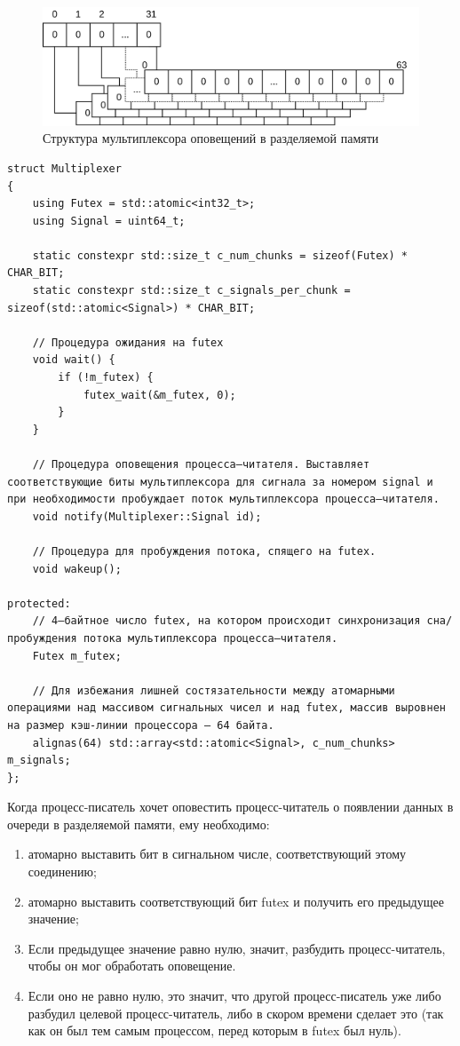 \begin{figure}[!h]
\caption{Структура мультиплексора оповещений в разделяемой памяти}
\label{chapter31:MuxZeroState}
\includegraphics[width=\textwidth]{../../graphics/schemes/futex}
\end{figure}

\begin{lstlisting}[float=!h,caption={Структура мультиплексора в памяти},label={chapter31:MultiplexerStruct},frame=tlrb]
struct Multiplexer
{
    using Futex = std::atomic<int32_t>;
    using Signal = uint64_t;

    static constexpr std::size_t c_num_chunks = sizeof(Futex) * CHAR_BIT;
    static constexpr std::size_t c_signals_per_chunk = sizeof(std::atomic<Signal>) * CHAR_BIT;
	
	// Процедура ожидания на futex
    void wait() {
    	if (!m_futex) {
   			futex_wait(&m_futex, 0);
   		}
    }
	
	// Процедура оповещения процесса—читателя. Выставляет соответствующие биты мультиплексора для сигнала за номером signal и при необходимости пробуждает поток мультиплексора процесса—читателя.
    void notify(Multiplexer::Signal id);
    
    // Процедура для пробуждения потока, спящего на futex.
    void wakeup();

protected:
	// 4—байтное число futex, на котором происходит синхронизация сна/пробуждения потока мультиплексора процесса—читателя.
    Futex m_futex;
	
	// Для избежания лишней состязательности между атомарными операциями над массивом сигнальных чисел и над futex, массив выровнен на размер кэш-линии процессора — 64 байта.
    alignas(64) std::array<std::atomic<Signal>, c_num_chunks> m_signals;
};
\end{lstlisting}

Когда процесс-писатель хочет оповестить процесс-читатель о появлении данных в очереди в разделяемой памяти, ему необходимо:
\begin{enumerate}
\item атомарно выставить бит в сигнальном числе, соответствующий этому соединению;
\item атомарно выставить соответствующий бит futex и получить его предыдущее значение;
\item Если предыдущее значение равно нулю, значит, разбудить процесс-читатель, чтобы он мог обработать оповещение.
\item Если оно не равно нулю, это значит, что другой процесс-писатель уже либо разбудил целевой процесс-читатель, либо в скором времени сделает это (так как он был тем самым процессом, перед которым в futex был нуль).
\end{enumerate}

